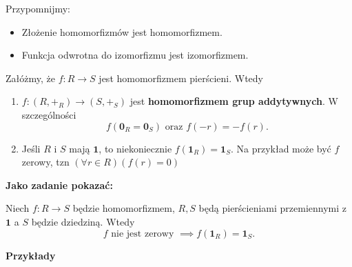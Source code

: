 \begin{remark}
	Przypomnijmy:
	\begin{itemize}
		\item Złożenie homomorfizmów jest homomorfizmem.
		\item Funkcja odwrotna do izomorfizmu jest izomorfizmem.
	\end{itemize}
\end{remark} 
\begin{remark}
	Załóżmy, że $f: R\to S $ jest homomorfizmem pierścieni. Wtedy
	\begin{enumerate}[label=\arabic*)]
		\item $f: \left( R, +_{\scriptscriptstyle R} \right) \to \left( S, +_{\scriptscriptstyle S} \right) $ jest \textbf{homomorfizmem grup addytywnych}. W szczególności  
			\[
			f\left( \mathbf{0}_{\scriptscriptstyle R} = \mathbf{0}_{\scriptscriptstyle S} \right) \text{ oraz } f\left( -r \right) = -f\left( r \right) 
			.\] 
		\item Jeśli  $R$ i $S$ mają $\mathbf{1}$, to niekoniecznie $f\left( \mathbf{1}_{\scriptscriptstyle R} \right) = \mathbf{1}_{\scriptscriptstyle S}$. Na przykład może być $f$ zerowy, tzn $\left(\forall r \in R \right)\left( f\left( r \right) = 0 \right)  $
	\end{enumerate}
\end{remark} 
\textbf{Jako zadanie pokazać:}

Niech $f: R \to S$ będzie homomorfizmem, $R,S$ będą pierścieniami przemiennymi z $\mathbf{1}$ a $S$ będzie dziedziną. Wtedy
\[
f \text{ nie jest zerowy } \implies f\left( \mathbf{1}_{R} \right) = \mathbf{1}_{\scriptscriptstyle S}
.\] 

\textbf{Przykłady} 

